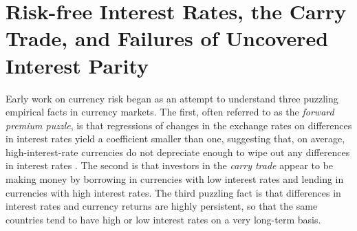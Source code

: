 \section{Risk-free Interest Rates, the Carry Trade, and Failures of
  Uncovered Interest Parity}

Early work on currency risk began as an attempt to understand three
puzzling empirical facts in currency markets. The first, often referred to as the \textit{forward premium puzzle}, is that
regressions of changes in the exchange rates on differences in
interest rates yield a coefficient smaller than one, suggesting that,
on average, high-interest-rate currencies do not depreciate enough to
wipe out any differences in interest rates \citep{Bilson1981, Fama1984}.
The second is that investors in the \textit{carry trade} appear to be
making money by borrowing in currencies with low interest
rates and lending in currencies with high interest rates. The third puzzling fact is that differences in 
interest rates and currency returns are highly persistent, so that the same
countries tend to have high or low interest rates on a very long-term
basis.



